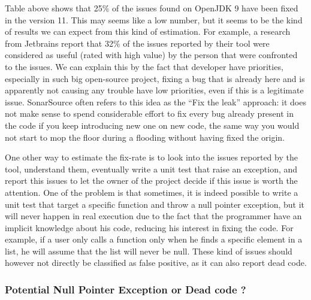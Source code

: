 Table above shows that 25\% of the issues found on OpenJDK 9 have been fixed in the version 11. This may seems like a low number, but it seems to be the kind of results we can expect from this kind of estimation. For example, a research from Jetbrains \cite{Bryksin:2018:DAK:3236454.3236457} report that 32\% of the issues reported by their tool were considered as useful (rated with high value) by the person that were confronted to the issues. 
We can explain this by the fact that developer have priorities, especially in such big open-source project, fixing a bug that is already here and is apparently not causing any trouble have low priorities, even if this is a legitimate issue. 
SonarSource often refers to this idea as the “Fix the leak” approach: it does not make sense to spend considerable effort to fix every bug already present in the code if you keep introducing new one on new code, the same way you would not start to mop the floor during a flooding without having fixed the origin. \newline

One other way to estimate the fix-rate is to look into the issues reported by the tool, understand them, eventually write a unit test that raise an exception, and report this issues to let the owner of the project decide if this issue is worth the attention.
One of the problem is that sometimes, it is indeed possible to write a unit test that target a specific function and throw a null pointer exception, but it will never happen in real execution due to the fact that the programmer have an implicit knowledge about his code, reducing his interest in fixing the code. 
For example, if a user only calls a function only when he finds a specific element in a list, he will assume that the list will never be null. 
These kind of issues should however not directly be classified as false positive, as it can also report dead code.

\subsubsection{Potential Null Pointer Exception or Dead code ?}
\label{subsubsec:dead_code}



